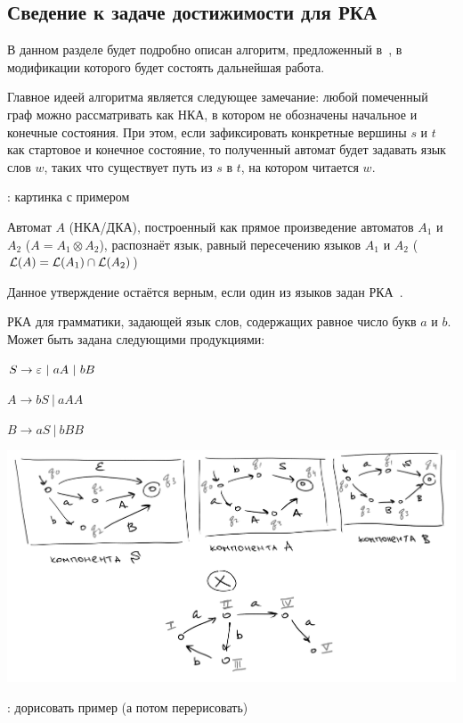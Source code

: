 \begin{definition}
\end{definition}

\begin{definition}
\end{definition}

\subsection{Сведение к задаче достижимости для РКА}

    В данном разделе будет подробно описан алгоритм, предложенный в~\cite{Orachev20}, в модификации которого будет состоять дальнейшая работа.

    Главное идеей алгоритма является следующее замечание: любой помеченный граф можно рассматривать как НКА, в котором не обозначены начальное и конечные состояния. При этом, если зафиксировать конкретные вершины $s$ и $t$ как стартовое и конечное состояние, то полученный автомат будет задавать язык слов $w$, таких что существует путь из $s$ в $t$, на котором читается $w$. 

    \TODO: картинка с примером

    \begin{proposition} \cite{Hopcroft1979}

    Автомат $A$ (НКА/ДКА), построенный как прямое произведение автоматов $A_1$ и $A_2$ ($A = A_1 \otimes A_2$), распознаёт язык, равный пересечению языков $A_1$ и $A_2$ ($\mathcal{L}(A) = \mathcal{L}(A_1) \cap \mathcal{L}(A_2)$)

    \end{proposition}

    Данное утверждение остаётся верным, если один из языков задан РКА~\cite{Beigel}.

    \begin{example}
        РКА для грамматики, задающей язык слов, содержащих равное число букв $a$ и $b$. Может быть задана следующими продукциями:

        $S \rightarrow \varepsilon~|~aA~|~bB$

        $A \to bS~|~aAA$
        
        $B \to aS~|~bBB$

        \includegraphics[width=1\linewidth]{img/example_intersection1.png}

        \TODO: дорисовать пример (а потом перерисовать)

    \end{example}

